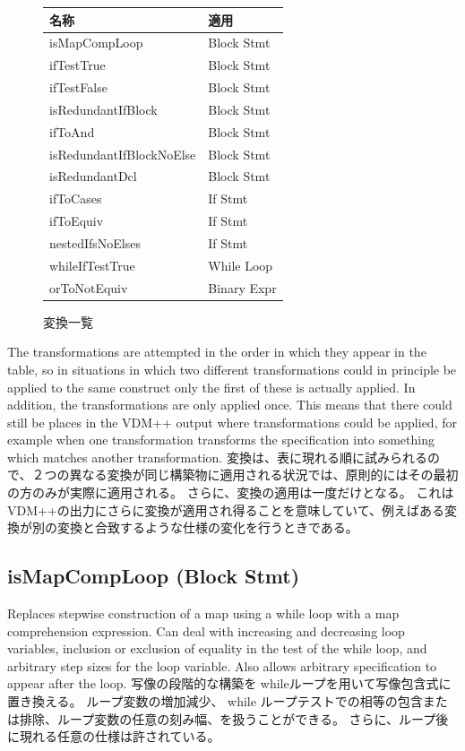 \documentclass[\pformat,12pt]{jarticle}
\begin{document}
\begin{figure}[htbp]
  \begin{center}
\begin{tabular}{|l|l|}
\hline 
名称 & 適用\\ \hline \hline
isMapCompLoop & Block Stmt  \\ \hline
ifTestTrue & Block Stmt  \\ \hline
ifTestFalse & Block Stmt  \\ \hline
isRedundantIfBlock & Block Stmt \\ \hline
ifToAnd & Block Stmt  \\ \hline
isRedundantIfBlockNoElse & Block Stmt \\ \hline
isRedundantDcl & Block Stmt \\ \hline
ifToCases & If Stmt \\ \hline
ifToEquiv & If Stmt \\ \hline
nestedIfsNoElses & If Stmt  \\ \hline
whileIfTestTrue &  While Loop \\ \hline
orToNotEquiv & Binary Expr \\ \hline
\end{tabular}    
    \caption{変換一覧}
    \label{fig:xfs}
  \end{center}
\end{figure}

The transformations are attempted in the order in which they appear in
the table, so in situations in which two different transformations
could in principle be applied to the same construct only the first of
these is actually applied. In addition, the transformations are only
applied once. This means that there could still be places in the VDM++
output where transformations could be applied, for example when one
transformation transforms the specification into something which
matches another transformation. 
変換は、表に現れる順に試みられるので、２つの異なる変換が同じ構築物に適用される状況では、原則的にはその最初の方のみが実際に適用される。
さらに、変換の適用は一度だけとなる。
これは VDM++の出力にさらに変換が適用され得ることを意味していて、例えばある変換が別の変換と合致するような仕様の変化を行うときである。

\subsection{isMapCompLoop (Block Stmt)} 
  Replaces stepwise construction of a map using a while loop with a
  map comprehension expression. Can deal with increasing and
  decreasing loop variables, inclusion or exclusion of equality in the
  test of the while loop, and arbitrary step sizes for the loop
  variable. Also allows arbitrary specification to appear after the
  loop. 
  写像の段階的な構築を whileループを用いて写像包含式に置き換える。
ループ変数の増加減少、 while ループテストでの相等の包含または排除、ループ変数の任意の刻み幅、を扱うことができる。
さらに、ループ後に現れる任意の仕様は許されている。
\end{document}
